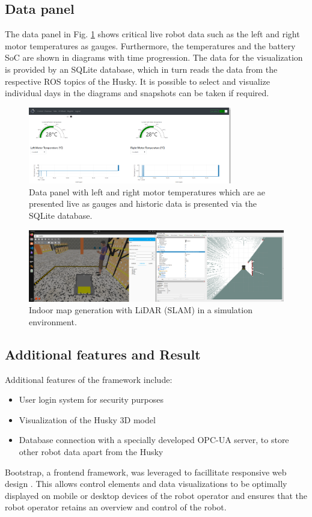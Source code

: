 \documentclass[letterpaper, 10 pt, conference]{ieeeconf}  %
\begin{document}
\subsection{Data panel}
The data panel in Fig. \ref{fig:overviewplots} shows critical live robot data such as the left and right motor temperatures as gauges. 
Furthermore, the temperatures and the battery SoC are shown in diagrams with time progression. 
The data for the visualization is provided by an SQLite database, which in turn reads the data from the respective ROS topics of the Husky. 
It is possible to select and visualize individual days in the diagrams and snapshots can be taken if required.
\begin{figure}[b]
    \centerline{\includegraphics[width=8.9cm]{images/overviewplots.png}}
    \caption{Data panel with left and right motor temperatures which are ae presented live as gauges and historic data is presented via the SQLite database.}
    \label{fig:overviewplots}
\end{figure}
\begin{figure}[htbp]
    \centerline{\includegraphics[width=16.35cm]{images/sim_husky_mapping.png}}
    \caption{Indoor map generation with LiDAR (SLAM) in a simulation environment.}
    \label{fig:huskymapping}
\end{figure}



\subsection{Additional features and Result}
Additional features of the framework include: 
\begin{itemize}
\item User login system for security purposes
\item Visualization of the Husky 3D model 
\item Database connection with a specially developed OPC-UA server, to store other robot data apart from the Husky
\end{itemize}
Bootstrap, a frontend framework, was leveraged to facillitate responsive web design \cite{bootstrap}. 
This allows control elements and data visualizations to be optimally displayed on mobile or desktop devices of the robot operator and ensures that the robot operator retains an overview and control of the robot.
\end{document}
